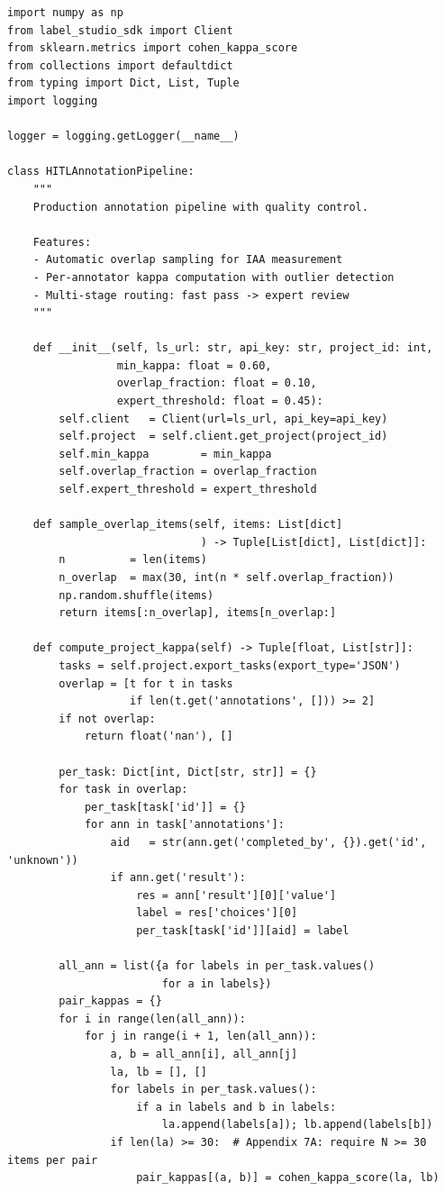 \begin{lstlisting}[style=python, caption={Production annotation pipeline with quality control}]
import numpy as np
from label_studio_sdk import Client
from sklearn.metrics import cohen_kappa_score
from collections import defaultdict
from typing import Dict, List, Tuple
import logging

logger = logging.getLogger(__name__)

class HITLAnnotationPipeline:
    """
    Production annotation pipeline with quality control.

    Features:
    - Automatic overlap sampling for IAA measurement
    - Per-annotator kappa computation with outlier detection
    - Multi-stage routing: fast pass -> expert review
    """

    def __init__(self, ls_url: str, api_key: str, project_id: int,
                 min_kappa: float = 0.60,
                 overlap_fraction: float = 0.10,
                 expert_threshold: float = 0.45):
        self.client   = Client(url=ls_url, api_key=api_key)
        self.project  = self.client.get_project(project_id)
        self.min_kappa        = min_kappa
        self.overlap_fraction = overlap_fraction
        self.expert_threshold = expert_threshold

    def sample_overlap_items(self, items: List[dict]
                              ) -> Tuple[List[dict], List[dict]]:
        n          = len(items)
        n_overlap  = max(30, int(n * self.overlap_fraction))
        np.random.shuffle(items)
        return items[:n_overlap], items[n_overlap:]

    def compute_project_kappa(self) -> Tuple[float, List[str]]:
        tasks = self.project.export_tasks(export_type='JSON')
        overlap = [t for t in tasks
                   if len(t.get('annotations', [])) >= 2]
        if not overlap:
            return float('nan'), []

        per_task: Dict[int, Dict[str, str]] = {}
        for task in overlap:
            per_task[task['id']] = {}
            for ann in task['annotations']:
                aid   = str(ann.get('completed_by', {}).get('id', 'unknown'))
                if ann.get('result'):
                    res = ann['result'][0]['value']
                    label = res['choices'][0]
                    per_task[task['id']][aid] = label

        all_ann = list({a for labels in per_task.values()
                        for a in labels})
        pair_kappas = {}
        for i in range(len(all_ann)):
            for j in range(i + 1, len(all_ann)):
                a, b = all_ann[i], all_ann[j]
                la, lb = [], []
                for labels in per_task.values():
                    if a in labels and b in labels:
                        la.append(labels[a]); lb.append(labels[b])
                if len(la) >= 30:  # Appendix 7A: require N >= 30 items per pair
                    pair_kappas[(a, b)] = cohen_kappa_score(la, lb)


\end{lstlisting}
